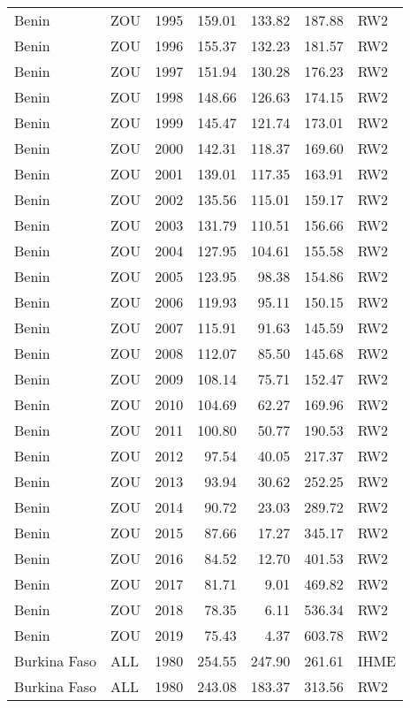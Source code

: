 \begin{longtable}{lllrrrl}
  Benin & ZOU & 1995 & 159.01 & 133.82 & 187.88 & RW2 \\ 
  Benin & ZOU & 1996 & 155.37 & 132.23 & 181.57 & RW2 \\ 
  Benin & ZOU & 1997 & 151.94 & 130.28 & 176.23 & RW2 \\ 
  Benin & ZOU & 1998 & 148.66 & 126.63 & 174.15 & RW2 \\ 
  Benin & ZOU & 1999 & 145.47 & 121.74 & 173.01 & RW2 \\ 
  Benin & ZOU & 2000 & 142.31 & 118.37 & 169.60 & RW2 \\ 
  Benin & ZOU & 2001 & 139.01 & 117.35 & 163.91 & RW2 \\ 
  Benin & ZOU & 2002 & 135.56 & 115.01 & 159.17 & RW2 \\ 
  Benin & ZOU & 2003 & 131.79 & 110.51 & 156.66 & RW2 \\ 
  Benin & ZOU & 2004 & 127.95 & 104.61 & 155.58 & RW2 \\ 
  Benin & ZOU & 2005 & 123.95 & 98.38 & 154.86 & RW2 \\ 
  Benin & ZOU & 2006 & 119.93 & 95.11 & 150.15 & RW2 \\ 
  Benin & ZOU & 2007 & 115.91 & 91.63 & 145.59 & RW2 \\ 
  Benin & ZOU & 2008 & 112.07 & 85.50 & 145.68 & RW2 \\ 
  Benin & ZOU & 2009 & 108.14 & 75.71 & 152.47 & RW2 \\ 
  Benin & ZOU & 2010 & 104.69 & 62.27 & 169.96 & RW2 \\ 
  Benin & ZOU & 2011 & 100.80 & 50.77 & 190.53 & RW2 \\ 
  Benin & ZOU & 2012 & 97.54 & 40.05 & 217.37 & RW2 \\ 
  Benin & ZOU & 2013 & 93.94 & 30.62 & 252.25 & RW2 \\ 
  Benin & ZOU & 2014 & 90.72 & 23.03 & 289.72 & RW2 \\ 
  Benin & ZOU & 2015 & 87.66 & 17.27 & 345.17 & RW2 \\ 
  Benin & ZOU & 2016 & 84.52 & 12.70 & 401.53 & RW2 \\ 
  Benin & ZOU & 2017 & 81.71 & 9.01 & 469.82 & RW2 \\ 
  Benin & ZOU & 2018 & 78.35 & 6.11 & 536.34 & RW2 \\ 
  Benin & ZOU & 2019 & 75.43 & 4.37 & 603.78 & RW2 \\ 
  Burkina Faso & ALL & 1980 & 254.55 & 247.90 & 261.61 & IHME \\ 
  Burkina Faso & ALL & 1980 & 243.08 & 183.37 & 313.56 & RW2 \\ 

\end{longtable}
